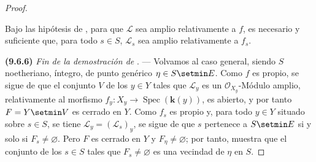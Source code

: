 \begin{proof}
\begin{corollary}[9.6.5]
\label{IV.9.6.5}
Bajo las hipótesis de , para que $\mathcal L$ sea amplio relativamente a $f$, es necesario y suficiente que, para todo $s\in S$, $\mathcal L_s$ sea amplio relativamente a $f_s$.
\end{corollary}

\label{IV.9.6.6}%
\textbf{(9.6.6)} \emph{Fin de la demostración de} . ---
Volvamos al caso general, siendo $S$ noetheriano, íntegro, de punto genérico $\eta\in S\setmin E$.
Como $f$ es propio, se sigue de  que el conjunto $V$ de los $y\in Y$ tales que $\mathcal L_y$ es un $\mathcal O_{X_y}$-Módulo amplio, relativamente al morfismo $f_y:X_y\to\operatorname{Spec}(\boldsymbol{k}(y))$, es abierto, y por tanto $F=Y\setmin V$ es cerrado en $Y$.
Como $f_s$ es propio y, para todo $y\in Y$ situado sobre $s\in S$, se tiene
$\mathcal L_y=(\mathcal L_s)_y$, se sigue de  que $s$ pertenece a
$S\setmin E$ si y solo si $F_s\neq\varnothing$.
Pero $F$ es cerrado en $Y$ y $F_\eta\neq\varnothing$; por tanto,  muestra
que el conjunto de los $s\in S$ tales que $F_s\neq\varnothing$ es una vecindad de
$\eta$ en $S$.
\end{proof}

